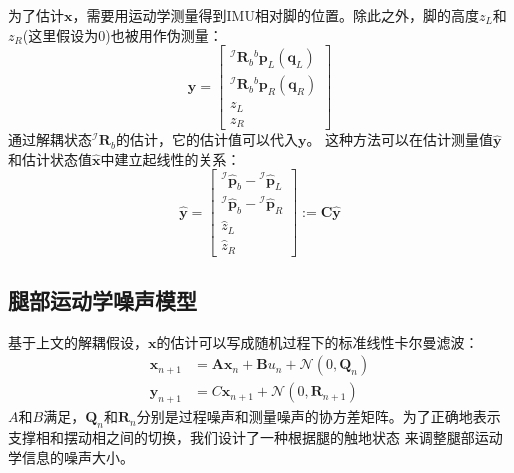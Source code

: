 为了估计$\boldsymbol{x}$，需要用运动学测量得到IMU相对脚的位置。除此之外，脚的高度$z_L$和$z_R$(这里假设为0)也被用作伪测量：
\begin{equation}
    \label{equ:est_posvel_mea}
    \boldsymbol{y}=\left[\begin{array}{c}
        { }^{\mathcal{I}} \boldsymbol{R}_b{ }^b \boldsymbol{p}_L\left(\boldsymbol{q}_L\right) \\
        { }^{\mathcal{I}} \boldsymbol{R}_b{ }^b \boldsymbol{p}_R\left(\boldsymbol{q}_R\right) \\
        z_L \\
        z_R
        \end{array}\right]
\end{equation}
通过解耦状态${ }^{\mathcal{I}} \boldsymbol{R}_{b}$的估计，它的估计值可以代入$\boldsymbol{y}$。
这种方法可以在估计测量值$\hat{\boldsymbol{y}}$和估计状态值$\hat{\boldsymbol{x}}$中建立起线性的关系：
\begin{equation}
    \label{equ:est_mea_model}
    \hat{\boldsymbol{y}}=\left[\begin{array}{c}
        { }^{\mathcal{I}} \hat{\boldsymbol{p}}_b-{ }^{\mathcal{I}} \hat{\boldsymbol{p}}_L \\
        { }^{\mathcal{I}} \hat{\boldsymbol{p}}_b-{ }^{\mathcal{I}} \hat{\boldsymbol{p}}_R \\
        \hat{z}_L \\
        \hat{z}_R
        \end{array}\right]:=\boldsymbol{C} \hat{\boldsymbol{y}}
\end{equation}
\subsection{腿部运动学噪声模型}
基于上文的解耦假设，$\boldsymbol{x}$的估计可以写成随机过程下的标准线性卡尔曼滤波：
\begin{equation}
    \label{equ:std_kf}
    \begin{aligned}
        \boldsymbol{x}_{n+1} & =\boldsymbol{A} \boldsymbol{x}_n+\boldsymbol{B} u_n+\mathcal{N}\left(0, \boldsymbol{Q}_n\right) \\
        \boldsymbol{y}_{n+1} & =C \boldsymbol{x}_{n+1}+\mathcal{N}\left(0, \boldsymbol{R}_{n+1}\right)
        \end{aligned}
\end{equation}
$A$和$B$满足，$\boldsymbol{Q}_n$和$\boldsymbol{R}_n$分别是过程噪声和测量噪声的协方差矩阵。为了正确地表示支撑相和摆动相之间的切换，我们设计了一种根据腿的触地状态
来调整腿部运动学信息的噪声大小。


